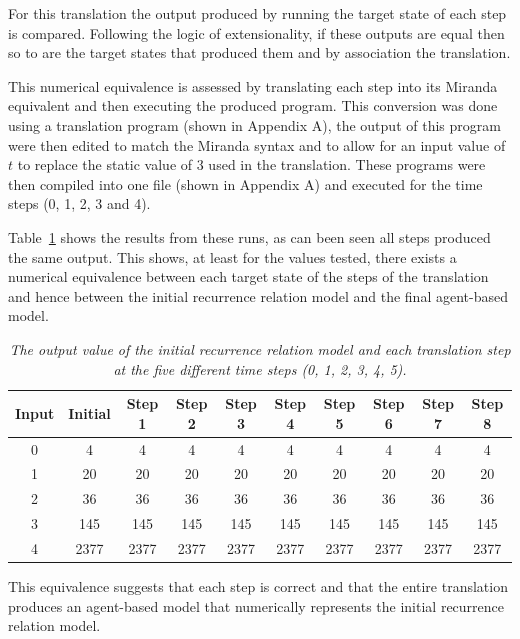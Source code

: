 \documentclass{article}
\begin{document}
For this translation the output produced by running the target state of each step is compared. Following the logic of extensionality, if these outputs are equal then so to are the target states that produced them and by association the translation. 

This numerical equivalence is assessed by translating each step into its Miranda equivalent and then executing the produced program. This conversion was done using a translation program (shown in Appendix A), the output of this program were then edited to match the Miranda syntax and to allow for an input value of $t$ to replace the static value of $3$ used in the translation. These programs were then compiled into one file (shown in Appendix A) and executed for the time steps  (0, 1, 2, 3 and 4). 

Table~\ref{tbl:meanfield_compare_to_Ising} shows the results from these runs, as can been seen all steps produced the same output. This shows, at least for the values tested, there exists a numerical equivalence between each target state of the steps of the translation and hence between the initial recurrence relation model and the final agent-based model. 
\begin{table}[H]
  \caption{\it The output value of the initial recurrence relation model and each translation step at the five different time steps (0, 1, 2, 3, 4, 5).}
\begin{center}
\begin{tabular}{ c|c|c|c|c|c|c|c|c|c } 
    \hline \hline
 Input & Initial & Step 1 & Step 2 & Step 3 & Step 4 & Step 5 & Step 6 & Step 7 & Step 8 \\ 
 \hline\hline
 0 & 4 & 4 & 4 & 4 & 4 & 4 & 4 & 4 &4 \\ 
 1 & 20 & 20 & 20 & 20 & 20 & 20 & 20 & 20 &20 \\ 
 2 & 36 & 36  & 36  & 36  & 36  & 36  & 36  & 36  &36 \\ 
 3 & 145 & 145  & 145  & 145  & 145  & 145  & 145  &145  &145 \\ 
 4 & 2377 & 2377 & 2377 & 2377 & 2377 & 2377 & 2377 & 2377 &2377\\
\end{tabular}
\end{center}
  \label{tbl:meanfield_compare_to_Ising}
\end{table}

This equivalence suggests that each step is correct and that the entire translation produces an agent-based model that numerically represents the initial recurrence relation model. 
\end{document}
